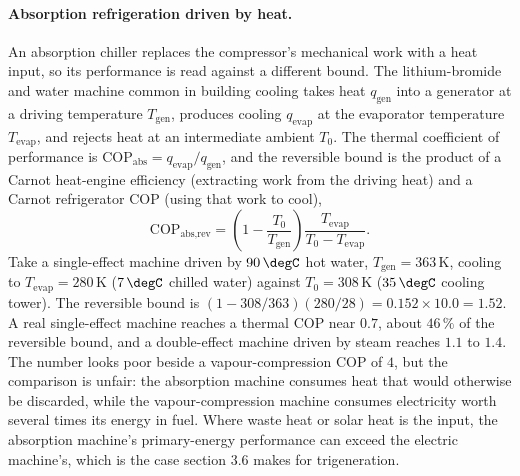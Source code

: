 \paragraph{Absorption refrigeration driven by heat.} An absorption chiller
replaces the compressor's mechanical work with a heat input, so its performance
is read against a different bound. The lithium-bromide and water machine common
in building cooling takes heat $q_{\text{gen}}$ into a generator at a driving
temperature $T_{\text{gen}}$, produces cooling $q_{\text{evap}}$ at the
evaporator temperature $T_{\text{evap}}$, and rejects heat at an intermediate
ambient $T_0$. The thermal coefficient of performance is
$\text{COP}_{\text{abs}} = q_{\text{evap}}/q_{\text{gen}}$, and the reversible
bound is the product of a Carnot heat-engine efficiency (extracting work from
the driving heat) and a Carnot refrigerator COP (using that work to cool),
\[
\text{COP}_{\text{abs,rev}} = \left(1 - \frac{T_0}{T_{\text{gen}}}\right)
\frac{T_{\text{evap}}}{T_0 - T_{\text{evap}}}.
\]
Take a single-effect machine driven by $90\,\degC$ hot water, $T_{\text{gen}} =
363\,\si{\kelvin}$, cooling to $T_{\text{evap}} = 280\,\si{\kelvin}$ ($7\,\degC$
chilled water) against $T_0 = 308\,\si{\kelvin}$ ($35\,\degC$ cooling tower).
The reversible bound is $(1 - 308/363)(280/28) = 0.152 \times 10.0 = 1.52$. A
real single-effect machine reaches a thermal COP near $0.7$, about $46\,\%$ of
the reversible bound, and a double-effect machine driven by steam reaches
$1.1$ to $1.4$. The number looks poor beside a vapour-compression COP of $4$,
but the comparison is unfair: the absorption machine consumes heat that would
otherwise be discarded, while the vapour-compression machine consumes
electricity worth several times its energy in fuel. Where waste heat or solar
heat is the input, the absorption machine's primary-energy performance can
exceed the electric machine's, which is the case section 3.6 makes for
trigeneration.

